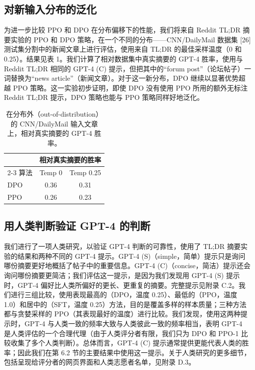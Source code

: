 \documentclass[11pt,UTF8,fontset=fandol]{ctexart}
\begin{document}
\subsection{对新输入分布的泛化}

为进一步比较 PPO 和 DPO 在分布偏移下的性能，我们将来自 Reddit TL;DR 摘要实验的 PPO 和 DPO 策略，在一个不同的分布——CNN/DailyMail 数据集 [26] 测试集分割中的新闻文章上进行评估，使用来自 TL;DR 的最佳采样温度（0 和 0.25）。结果见表 1。我们计算了相对数据集中真实摘要的 GPT-4 胜率，使用与 Reddit TL;DR 相同的 GPT-4 (C) 提示，但把其中的“forum post”（论坛帖子）一词替换为“news article”（新闻文章）。对于这一新分布，DPO 继续以显著优势超越 PPO 策略。这一实验初步证明，即使 DPO 没有使用 PPO 所用的额外无标注 Reddit TL;DR 提示，DPO 策略也能与 PPO 策略同样好地泛化。

\begin{table}[H]\centering
\caption{在分布外（out-of-distribution）的 CNN/DailyMail 输入文章上，相对真实摘要的 GPT-4 胜率。}
\label{tab:1}
\begin{tabular}{lcc}
\toprule
 & \multicolumn{2}{c}{相对真实摘要的胜率} \\
\cmidrule(lr){2-3}
算法 & Temp 0 & Temp 0.25 \\
\midrule
DPO & 0.36 & 0.31 \\
PPO & 0.26 & 0.23 \\
\bottomrule
\end{tabular}
\end{table}

\subsection{用人类判断验证 GPT-4 的判断}

我们进行了一项人类研究，以验证 GPT-4 判断的可靠性，使用了 TL;DR 摘要实验的结果和两种不同的 GPT-4 提示。GPT-4 (S)（simple，简单）提示只是询问哪份摘要更好地概括了帖子中的重要信息。GPT-4 (C)（concise，简洁）提示还会询问哪份摘要更简洁；我们评估这一提示，是因为我们发现用 GPT-4 (S) 提示时，GPT-4 偏好比人类所偏好的更长、更重复的摘要。完整提示见附录 C.2。我们进行三组比较，使用表现最高的（DPO，温度 0.25）、最低的（PPO，温度 1.0）和居中的（SFT，温度 0.25）方法，目的是覆盖多样的样本质量；三种方法都与贪婪采样的 PPO（其表现最好的温度）进行比较。我们发现，使用这两种提示时，GPT-4 与人类一致的频率大致与人类彼此一致的频率相当，表明 GPT-4 是人类评估的一个合理代理（由于人类评分者有限，我们只为 DPO 和 PPO-1 比较收集了多个人类判断）。总体而言，GPT-4 (C) 提示通常提供更能代表人类的胜率；因此我们在第 6.2 节的主要结果中使用这一提示。关于人类研究的更多细节，包括呈现给评分者的网页界面和人类志愿者名单，见附录 D.3。
\end{document}
